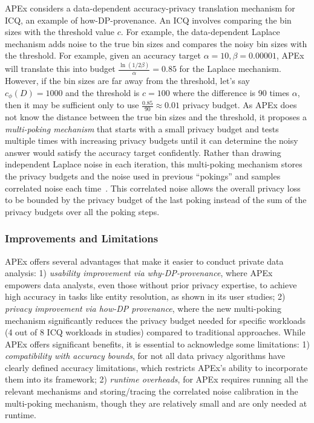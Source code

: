  APEx considers a data-dependent accuracy-privacy translation mechanism for ICQ, an example of how-DP-provenance.
An ICQ involves comparing the bin sizes with the threshold value $c$. For example, the data-dependent Laplace mechanism adds noise to the true bin sizes and compares the noisy bin sizes with the threshold. For example, given an accuracy target $\alpha=10, \beta=0.00001$, APEx will translate this into budget $\frac{\ln{(1/2\beta)}}{\alpha} = 0.85$ for the Laplace mechanism. However, if the bin sizes are far away from the threshold, let's say $c_{\phi}(D)=1000$ and the threshold is $c=100$ where the difference is 90 times $\alpha$, then it may be sufficient only to use $\frac{0.85}{90} \approx 0.01$ privacy budget. As APEx does not know the distance between the true bin sizes and the threshold, it proposes a \textit{multi-poking mechanism} that starts with a small privacy budget and tests multiple times with increasing privacy budgets until it can determine the noisy answer would satisfy the accuracy target confidently. 
Rather than drawing independent Laplace noise in each iteration, this multi-poking mechanism stores the privacy budgets and the noise used in previous ``pokings'' and samples correlated noise each time~\cite{koufogiannis2015gradual}. This correlated noise allows the overall privacy loss to be bounded by the privacy budget of the last poking instead of the sum of the privacy budgets over all the poking steps.

\subsubsection{Improvements and Limitations}
APEx offers several advantages that make it easier to conduct private data analysis:
1) \textit{usability improvement via why-DP-provenance}, where APEx empowers data analysts, even those without prior privacy expertise, to achieve high accuracy in tasks like entity resolution, as shown in its user studies; 2) \emph{privacy improvement via how-DP provenance}, where the new multi-poking mechanism significantly reduces the privacy budget needed for specific workloads (4 out of 8 ICQ workloads in studies) compared to traditional approaches.
While APEx offers significant benefits, it is essential to acknowledge some limitations: 1) \textit{compatibility with accuracy bounds}, for not all data privacy algorithms have clearly defined accuracy limitations, which restricts APEx's ability to incorporate them into its framework; 2) \textit{runtime overheads}, for 
APEx requires running all the relevant mechanisms and storing/tracing the correlated noise calibration in the multi-poking mechanism, though they are relatively small and are only needed at runtime.



